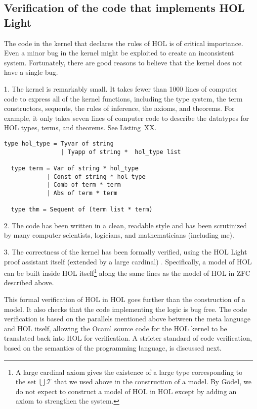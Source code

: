 \documentclass[brochure,english,12pt]{bourbaki}
\theoremstyle{plain}
\def\T{{\mathcal T}}
\begin{document}
\subsection{Verification of the code that implements HOL Light}

The code in the kernel that declares the rules of HOL is of critical importance.  
Even a minor bug in the kernel might be exploited to create an inconsistent system.  Fortunately,
there are good reasons to believe that the kernel does not have a single bug.

1.  The kernel is remarkably small.  It takes fewer than 1000 lines of computer code to express
all of the kernel functions, including the type system, the term constructors, sequents, the rules of inference,
the axioms, and theorems.  For example, it only takes seven lines of computer code to describe the datatypes
for HOL types, terms, and theorems.  See Listing~XX.

\begin{lstlisting}[keepspaces=true,stringstyle=\tt,basicstyle=\small,frame=single,framesep=8pt,mathescape,morekeywords={type},columns=flexible,caption={Code from the kernel of HOL Light \cite{HOLL}}]
  type hol_type = Tyvar of string
                | Tyapp of string *  hol_type list

  type term = Var of string * hol_type
            | Const of string * hol_type
            | Comb of term * term
            | Abs of term * term

  type thm = Sequent of (term list * term)
\end{lstlisting}

2.  The code has been written in a clean, readable style and has been scrutinized by many computer scientists,
logicians, and mathematicians (including me).

3.  The correctness of the kernel has been formally verified, using the HOL Light proof assistant itself (extended by a large
cardinal) \cite{HaSelf}.  Specifically,
a model of HOL can be built inside HOL itself\footnote{A large cardinal axiom 
 gives the existence of a large type corresponding to the set $\bigcup\T$ that we used above in the construction of a model.
By G\"odel, we do not expect to construct a model of HOL in HOL except by 
adding an axiom to strengthen the system.} along the same
lines as the model of HOL in ZFC described above.  

This formal verification of HOL in HOL goes  further than the construction of a model.
It also checks that the code implementing the logic is bug free.  The code verification is based on the 
parallels mentioned above between the meta language and HOL itself, allowing the Ocaml source code for the HOL kernel to be
translated back into HOL for verification.  A stricter standard of code verification, based
on the semantics of the programming language, is discussed next.
\end{document}
